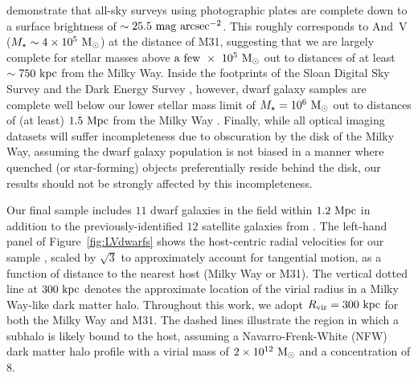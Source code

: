 \documentclass[usenatbib]{mnras}
\newcommand{\rvir}{R_{\rm vir}}
\newcommand{\mstar}{{M}_{\star}}
\newcommand{\msun}{{\rm M}_{\odot}}
\begin{document}
\citet{whiting07} demonstrate that all-sky surveys using photographic plates are
complete down to a surface brightness of
$\sim 25.5~{\rm mag}~{\rm arcsec}^{-2}$.
%
This roughly corresponds to And~V ($\mstar \sim 4\times10^{5}~\msun$) at the
distance of M31, suggesting that we are largely complete for stellar masses
above ${\rm a~few}~\times~10^{5}~\msun$ out to distances of at least
$\sim 750~{\rm kpc}$ from the Milky Way.
%
Inside the footprints of the Sloan Digital Sky Survey \citep{york00} and the
Dark Energy Survey \citep{DES05, DES14}, however, dwarf galaxy samples are
complete well below our lower stellar mass limit of $\mstar = 10^{6}~\msun$ out
to distances of (at least) $1.5~{\rm Mpc}$ from the Milky Way \citep{koposov08,
  tollerud08, walsh09, jethwa16, newton17}.
Finally, while all optical imaging datasets will suffer incompleteness due to
obscuration by the disk of the Milky Way, assuming the dwarf galaxy population
is not biased in a manner where quenched (or star-forming) objects
preferentially reside behind the disk, our results should not be strongly
affected by this incompleteness.
%





Our final sample includes $11$ dwarf galaxies in the field within
$1.2~{\rm Mpc}$ in addition to the previously-identified $12$
satellite galaxies from \citet{fham15}.
%
The left-hand panel of Figure~\ref{fig:LVdwarfs} shows the host-centric
radial velocities for our sample \citep{mcconnachie12, tollerud12,
  makarova17}, scaled by $\sqrt{3}$ to approximately account for
tangential motion, as a function of distance to the nearest host
(Milky Way or M31). 
%
The vertical dotted line at $300~{\rm kpc}$ denotes the approximate location of
the virial radius in a Milky Way-like dark matter halo. Throughout this work, we
adopt $\rvir = 300~{\rm kpc}$ for both the Milky Way and M31.
%
The dashed lines illustrate the region in which a subhalo is likely
bound to the host, assuming a Navarro-Frenk-White (NFW) dark matter
halo profile \citep{nfw97} with a virial mass of $2\times
10^{12}~\msun$ and a concentration of $8$. 
%

\end{document}
